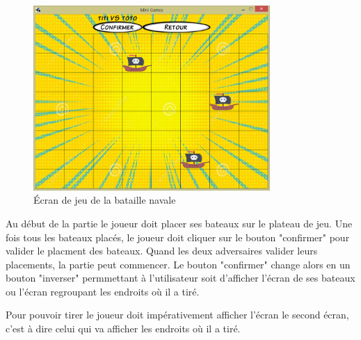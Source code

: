 \documentclass{report}
\begin{document}
\begin{figure}[H]
	\centering\includegraphics[width=9cm]{notreBataille}
	\caption{Écran de jeu de la bataille navale}
    \label{notreBataille}
\end{figure}

Au début de la partie le joueur doit placer ses bateaux sur le plateau de jeu. Une fois
tous les bateaux placés, le joueur doit cliquer sur le bouton "confirmer" pour valider le placment des bateaux.
Quand les deux adversaires valider leurs placements, la partie peut commencer. Le bouton "confirmer" change alors en un
bouton "inverser" permmettant à l'utilisateur soit d'afficher l'écran de ses bateaux ou l'écran regroupant les endroits où il a tiré.

Pour pouvoir tirer le joueur doit impérativement afficher l'écran le second écran, c'est à dire celui qui va afficher les endroits où il a tiré.
\end{document}
